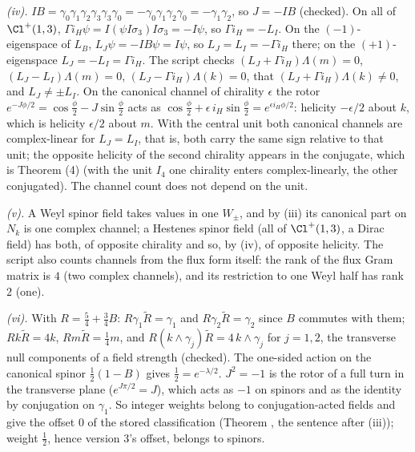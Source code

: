 \emph{(iv).} $IB = \gamma_{0}\gamma_{1}\gamma_{2}\gamma_{3}\gamma_{3}\gamma_{0} = -\gamma_{0}\gamma_{1}\gamma_{2}\gamma_{0} = -\gamma_{1}\gamma_{2}$, so $J = -IB$ (checked). On all of $\Cl^{+}(1,3)$, $\Gamma i_{H}\psi = I(\psi I\sigma_{3})I\sigma_{3} = -I\psi$, so $\Gamma i_{H} = -L_{I}$. On the $(-1)$-eigenspace of $L_{B}$, $L_{J}\psi = -IB\psi = I\psi$, so $L_{J} = L_{I} = -\Gamma i_{H}$ there; on the $(+1)$-eigenspace $L_{J} = -L_{I} = \Gamma i_{H}$. The script checks $(L_{J} + \Gamma i_{H})\Lambda(m) = 0$, $(L_{J} - L_{I})\Lambda(m) = 0$, $(L_{J} - \Gamma i_{H})\Lambda(k) = 0$, that $(L_{J} + \Gamma i_{H})\Lambda(k) \neq 0$, and $L_{J} \neq \pm L_{I}$. On the canonical channel of chirality $\epsilon$ the rotor $e^{-J\phi/2} = \cos\tfrac{\phi}{2} - J\sin\tfrac{\phi}{2}$ acts as $\cos\tfrac{\phi}{2} + \epsilon\,i_{H}\sin\tfrac{\phi}{2} = e^{\epsilon i_{H}\phi/2}$: helicity $-\epsilon/2$ about $k$, which is helicity $\epsilon/2$ about $m$. With the central unit both canonical channels are complex-linear for $L_{J} = L_{I}$, that is, both carry the same sign relative to that unit; the opposite helicity of the second chirality appears in the conjugate, which is Theorem (4) (with the unit $I_{4}$ one chirality enters complex-linearly, the other conjugated). The channel count does not depend on the unit.

\emph{(v).} A Weyl spinor field takes values in one $W_{\pm}$, and by (iii) its canonical part on $N_{k}$ is one complex channel; a Hestenes spinor field (all of $\Cl^{+}(1,3)$, a Dirac field) has both, of opposite chirality and so, by (iv), of opposite helicity. The script also counts channels from the flux form itself: the rank of the flux Gram matrix is $4$ (two complex channels), and its restriction to one Weyl half has rank $2$ (one).

\emph{(vi).} With $R = \tfrac54 + \tfrac34 B$: $R\gamma_{1}\tilde{R} = \gamma_{1}$ and $R\gamma_{2}\tilde{R} = \gamma_{2}$ since $B$ commutes with them; $Rk\tilde{R} = 4k$, $Rm\tilde{R} = \tfrac14 m$, and $R(k\wedge\gamma_{j})\tilde{R} = 4\,k\wedge\gamma_{j}$ for $j = 1, 2$, the transverse null components of a field strength (checked). The one-sided action on the canonical spinor $\tfrac12(1 - B)$ gives $\tfrac12 = e^{-\lambda/2}$. $J^{2} = -1$ is the rotor of a full turn in the transverse plane ($e^{J\pi/2} = J$), which acts as $-1$ on spinors and as the identity by conjugation on $\gamma_{1}$. So integer weights belong to conjugation-acted fields and give the offset $0$ of the stored classification (Theorem , the sentence after (iii)); weight $\tfrac12$, hence version 3's offset, belongs to spinors.

